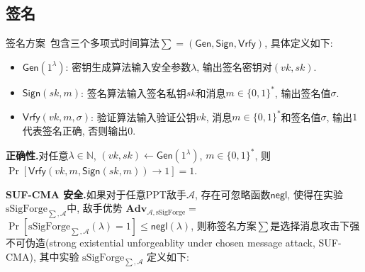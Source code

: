 \documentclass[review]{jcr}
\begin{document}
\subsection{签名}
签名方案~\cite{AumayrEEFHMMR20}包含三个多项式时间算法$\sum=(\mathsf{Gen},\mathsf{Sign},\mathsf{Vrfy})$, 具体定义如下: 

\begin{itemize}
\item $\mathsf{Gen}(1^\lambda)$: 密钥生成算法输入安全参数$\lambda$, 输出签名密钥对$(vk,sk)$. 
\item $\mathsf{Sign}(sk,m)$: 签名算法输入签名私钥$sk$和消息$m\in\{0,1\}^*$, 输出签名值$\sigma$. 
\item $\mathsf{Vrfy}(vk,m,\sigma)$: 验证算法输入验证公钥$vk$, 消息$m\in\{0,1\}^*$和签名值$\sigma$, 输出$1$代表签名正确, 否则输出$0$. 
\end{itemize}

\begin{trivlist}
\item \textbf{正确性.}对任意$\lambda\in \mathbb{N}$, $(vk,sk)\leftarrow \mathsf{Gen}(1^\lambda)$, $m\in\{0,1\}^*$, 则$\Pr[\mathsf{Vrfy}(vk,m,\mathsf{Sign}(sk,m))\rightarrow 1]=1$. 
\end{trivlist}
\begin{trivlist}
\item \textbf{SUF-CMA 安全.}如果对于任意PPT敌手$\mathcal{A}$, 存在可忽略函数$\mathsf{negl}$, 使得在实验$\text{sSigForge}_{\sum,\mathcal{A}}$中, 敌手优势
$\textbf{Adv}_{\mathcal{A},\text{sSigForge}}=$$\Pr[\text{sSigForge}_{\sum,\mathcal{A}}(\lambda)=1]\leq \mathsf{negl}(\lambda)$, 则称签名方案$\sum$是选择消息攻击下强不可伪造(strong existential unforgeablity under chosen message attack, SUF-CMA), 其中实验 $\text{sSigForge}_{\sum,\mathcal{A}}$ 定义如下: 

\begin{center}
\end{center}

\end{trivlist}
\end{document}
